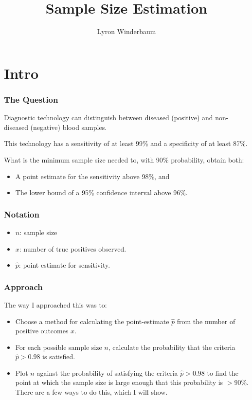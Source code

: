 \documentclass{beamer}\usepackage{knitr}
\title{Sample Size Estimation}
\author{Lyron Winderbaum}
\begin{document}
\section{Intro}

\maketitle

\begin{frame}
  \frametitle{The Question}
  
  Diagnostic technology can distinguish between diseased (positive) and non-diseased (negative) blood samples.
  
  This technology has a sensitivity of at least 99\% and a specificity of at least 87\%.
  
  What is the minimum sample size needed to, with 90\% probability, obtain both:
  \begin{itemize}
    \item A point estimate for the sensitivity above 98\%, and
    \item The lower bound of a 95\% confidence interval above 96\%.
  \end{itemize}
  
\end{frame}

\begin{frame}
  \frametitle{Notation}
  
  \begin{itemize}
    \item $n$: sample size
    \item $x$: number of true positives observed.
    \item $\hat{p}$: point estimate for sensitivity.
  \end{itemize}
  
\end{frame}



\begin{frame}
\frametitle{Approach}

The way I approached this was to:
\begin{itemize}
  \item Choose a method for calculating the point-estimate $\hat{p}$ from the number of positive outcomes $x$. 
  \item For each possible sample size $n$, calculate the probability that the criteria $\hat{p} > 0.98$ is satisfied.
  \item Plot $n$ against the probability of satisfying the criteria $\hat{p} > 0.98$ to find the point at which the sample size is large enough that this probability is $> 90\%$. There are a few ways to do this, which I will show. 
\end{itemize}

\end{frame}
\end{document}
